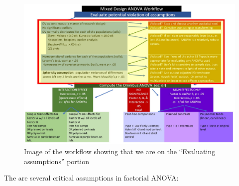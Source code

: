 \documentclass[
  11pt,
]{book}
\begin{document}
\begin{figure}
\centering
\includegraphics{images/mixed/mx_Assumptions.jpg}
\caption{Image of the workflow showing that we are on the ``Evaluating assumptions'' portion}
\end{figure}

The are several critical assumptions in factorial ANOVA:
\end{document}
